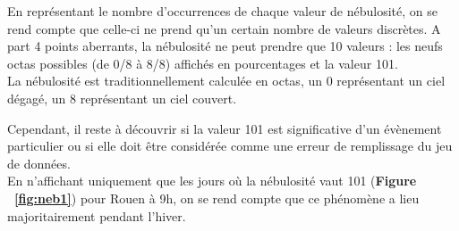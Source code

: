 \documentclass{article} %
\begin{document}
En représentant le nombre d’occurrences de chaque valeur de nébulosité, on se rend compte que celle-ci ne prend qu’un certain nombre de valeurs discrètes. A part 4 points aberrants, la nébulosité ne peut prendre que 10 valeurs : les neufs octas possibles (de 0/8 à 8/8) affichés en pourcentages et la valeur 101. \\

La nébulosité est traditionnellement calculée en octas, un 0 représentant un ciel dégagé, un 8 représentant un ciel couvert.

Cependant, il reste à découvrir si la valeur 101 est significative d’un évènement particulier ou si elle doit être considérée comme une erreur de remplissage du jeu de données.\\
En n’affichant uniquement que les jours où la nébulosité vaut 101 (\textbf{Figure ~\ref{fig:neb1}}) pour Rouen à 9h, on se rend compte que ce phénomène a lieu majoritairement pendant l’hiver.
\newpage
\end{document}
